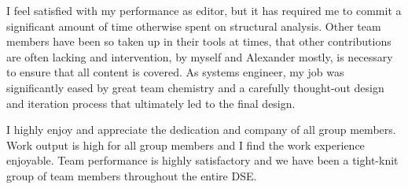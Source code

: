 I feel satisfied with my performance as editor, but it has required me to commit a significant amount of time otherwise spent on structural analysis. Other team members have been so taken up in their tools at times, that other contributions are often lacking and intervention, by myself and Alexander mostly, is necessary to ensure that all content is covered. As systems engineer, my job was significantly eased by great team chemistry and a carefully thought-out design and iteration process that ultimately led to the final design. 

I highly enjoy and appreciate the dedication and company of all group members. Work output is high for all group members and I find the work experience enjoyable. Team performance is highly satisfactory and we have been a tight-knit group of team members throughout the entire DSE.


